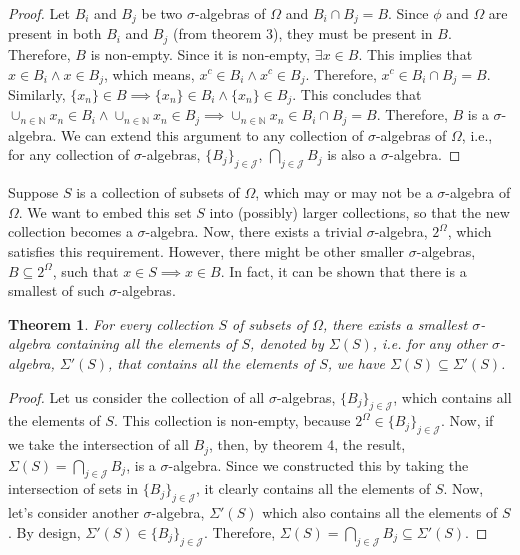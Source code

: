 \documentclass{report}
\theoremstyle{plain}
\newtheorem{theorem}{Theorem}[chapter] %
\theoremstyle{definition}
\begin{document}
\begin{proof}
Let $B_i$ and $B_j$ be two $\sigma$-algebras of $\Omega$ and $B_i\cap B_j=B$. Since $\phi$ and $\Omega$ are present in both $B_i$ and $B_j$ (from theorem 3), they must be present in $B$. Therefore, $B$ is non-empty. Since it is non-empty, $\exists x\in B$. This implies that $x\in B_i\wedge x\in B_j$, which means, $x^c\in B_i\wedge x^c\in B_j$. Therefore, $x^c\in B_i\cap B_j=B$. Similarly, $\{x_n\}\in B\implies \{x_n\}\in B_i\wedge\{x_n\}\in B_j$. This concludes that $\cup_{n\in\mathbb{N}} x_n\in B_i\wedge \cup_{n\in\mathbb{N}} x_n\in B_j\implies \cup_{n\in\mathbb{N}} x_n\in B_i\cap B_j=B$. Therefore, $B$ is a $\sigma$-algebra. We can extend this argument to any collection of $\sigma$-algebras of $\Omega$, i.e., for any collection of $\sigma$-algebras, $\{B_j\}_{j\in\mathcal{J}}$, $\bigcap_{j\in\mathcal{J}}B_j$ is also a $\sigma$-algebra.
\end{proof}
\noindent Suppose $S$ is a collection of subsets of $\Omega$, which may or may not be a $\sigma$-algebra of $\Omega$. We want to embed this set $S$ into (possibly) larger collections, so that the new collection becomes a $\sigma$-algebra. Now, there exists a trivial $\sigma$-algebra, $2^\Omega$, which satisfies this requirement. However, there might be other smaller $\sigma$-algebras, $B\subseteq 2^\Omega$, such that $x\in S\implies x\in B$. In fact, it can be shown that there is a smallest of such $\sigma$-algebras.
\begin{theorem}
For every collection $S$ of subsets of $\Omega$, there exists a smallest $\sigma$-algebra containing all the elements of $S$, denoted by $\Sigma(S)$, i.e. for any other $\sigma$-algebra, $\Sigma'(S)$, that contains all the elements of $S$, we have $\Sigma(S)\subseteq\Sigma'(S)$.
\end{theorem}
\begin{proof}
Let us consider the collection of all $\sigma$-algebras, $\{B_j\}_{j\in\mathcal{J}}$, which contains all the elements of $S$. This collection is non-empty, because $2^\Omega\in \{B_j\}_{j\in\mathcal{J}}$. Now, if we take the intersection of all $B_j$, then, by theorem 4, the result, $\Sigma(S)=\bigcap_{j\in\mathcal{J}} B_j$, is a $\sigma$-algebra. Since we constructed this by taking the intersection of sets in $\{B_j\}_{j\in\mathcal{J}}$, it clearly contains all the elements of $S$. Now, let's consider another $\sigma$-algebra, $\Sigma'(S)$ which also contains all the elements of $S$. By design, $\Sigma'(S)\in \{B_j\}_{j\in\mathcal{J}}$. Therefore, $\Sigma(S)=\bigcap_{j\in\mathcal{J}} B_j\subseteq\Sigma'(S)$.
\end{proof}
\end{document}
